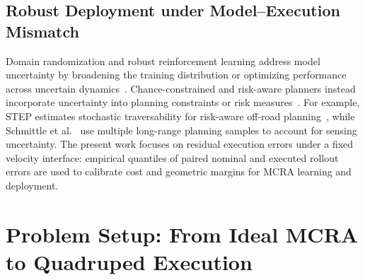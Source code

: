 \documentclass[conference]{IEEEtran}
\begin{document}
\subsection{Robust Deployment under Model--Execution Mismatch}
Domain randomization and robust reinforcement learning address model uncertainty
by broadening the training distribution or optimizing performance across uncertain
dynamics~\cite{tobin2017,smirnova2019,wang2021,liu2022drql}. Chance-constrained and
risk-aware planners instead incorporate uncertainty into planning constraints or
risk measures~\cite{theurkauf2023,fan2021step,schmittle2024}. For example, STEP
estimates stochastic traversability for risk-aware off-road
planning~\cite{fan2021step}, while Schmittle et al.~\cite{schmittle2024} use
multiple long-range planning samples to account for sensing uncertainty. The
present work focuses on residual execution errors under a fixed velocity
interface: empirical quantiles of paired nominal and executed rollout errors are
used to calibrate cost and geometric margins for MCRA learning and deployment.

\section{Problem Setup: From Ideal MCRA to Quadruped Execution}
\label{sec:problem_setup}
\end{document}
